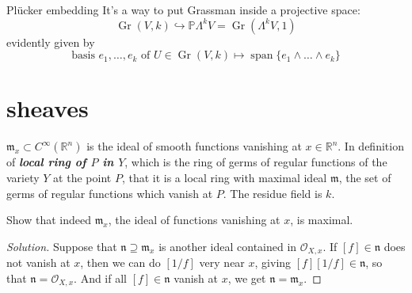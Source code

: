 \begin{thing7}{Plücker embedding}\leavevmode
It's a way to put Grassman inside a projective space:
\[\operatorname{Gr}(V,k) \hookrightarrow \mathbb{P}\Lambda^{k}V = \operatorname{Gr}(\Lambda^{k}V,1)\]
evidently given by
\[\text{basis } e_1,\ldots,e_k\text{ of \(U \in \operatorname{Gr}(V,k)\)}\longmapsto \operatorname{span}\{e_1 \wedge \ldots \wedge e_k\}\]


\end{thing7}




\section{sheaves}

\(\mathfrak{m}_x \subset C^\infty(\mathbb{R}^n)\) is the ideal of smooth functions vanishing at \(x \in \mathbb{R}^n\). In \cite{hart} definition of \textit{\textbf{local ring of \(P\) in \(Y\)}}, which is the ring of germs of regular functions of the variety \(Y\) at the point \(P\), that it is a local ring with maximal ideal \(\mathfrak{m}\), the set of germs of regular functions which vanish at \(P\). The residue field is \(k\).

\begin{exercise}\leavevmode
Show that indeed \(\mathfrak{m}_x\), the ideal of functions vanishing at \(x\), is maximal.
\end{exercise}
\begin{proof}[Solution]\leavevmode
	Suppose that \(\mathfrak{n} \supseteq \mathfrak{m}_x\) is another ideal contained in \(\mathcal{O}_{X,x}\). If \([f] \in \mathfrak{n}\) does not vanish at \(x\), then we can do \([1/f]\) very near  \(x\), giving \([f][1/f] \in \mathfrak{n}\), so that \(\mathfrak{n}=\mathcal{O}_{X,x}\). And if all \([f] \in \mathfrak{n}\) vanish at \(x\), we get \(\mathfrak{n}=\mathfrak{m}_x\).
\end{proof}

